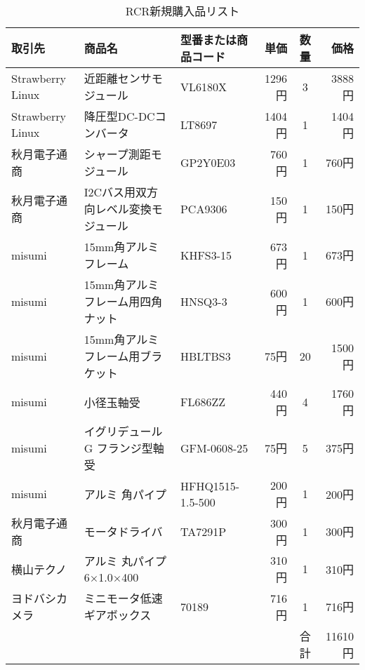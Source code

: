 \newpage
\begin{table}[H]
\begin{center}
   \caption{RCR新規購入品リスト}
  \begin{tabular}{|l|l|l|r|c|r|}  \hline
  取引先 & 商品名 & 型番または商品コード & 単価 & 数量 & 価格 \\   \hline \hline
  Strawberry Linux & 近距離センサモジュール & VL6180X & 1296円 & 3 & 3888円 \\    \hline
  Strawberry Linux & 降圧型DC-DCコンバータ & LT8697 & 1404円 & 1 & 1404円  \\      \hline
  秋月電子通商 & シャープ測距モジュール & GP2Y0E03 & 760円 & 1 & 760円  \\      \hline
  秋月電子通商 & I2Cバス用双方向レベル変換モジュール & PCA9306 & 150円 & 1 & 150円  \\      \hline
  misumi & 15mm角アルミフレーム & KHFS3-15 & 673円 & 1 & 673円  \\      \hline
  misumi & 15mm角アルミフレーム用四角ナット & HNSQ3-3 & 600円 & 1 & 600円  \\       \hline
  misumi & 15mm角アルミフレーム用ブラケット & HBLTBS3 & 75円 & 20 & 1500円  \\      \hline
  misumi & 小径玉軸受 & FL686ZZ & 440円 & 4 & 1760円  \\      \hline
  misumi & イグリデュールG フランジ型軸受 & GFM-0608-25 & 75円 & 5 & 375円 \\     \hline
  misumi & アルミ 角パイプ & HFHQ1515-1.5-500 & 200円 & 1 & 200円  \\       \hline
  秋月電子通商 & モータドライバ & TA7291P & 300円 & 1 & 300円  \\      \hline
  横山テクノ & アルミ 丸パイプ 6×1.0×400 & & 310円 & 1 & 310円 \\        \hline
  ヨドバシカメラ & ミニモータ低速ギアボックス & 70189 & 716円 & 1 & 716円  \\      \hline
 & & & & 合計 & 11610円  \\      \hline
 \end{tabular}
\end{center}
\end{table}
